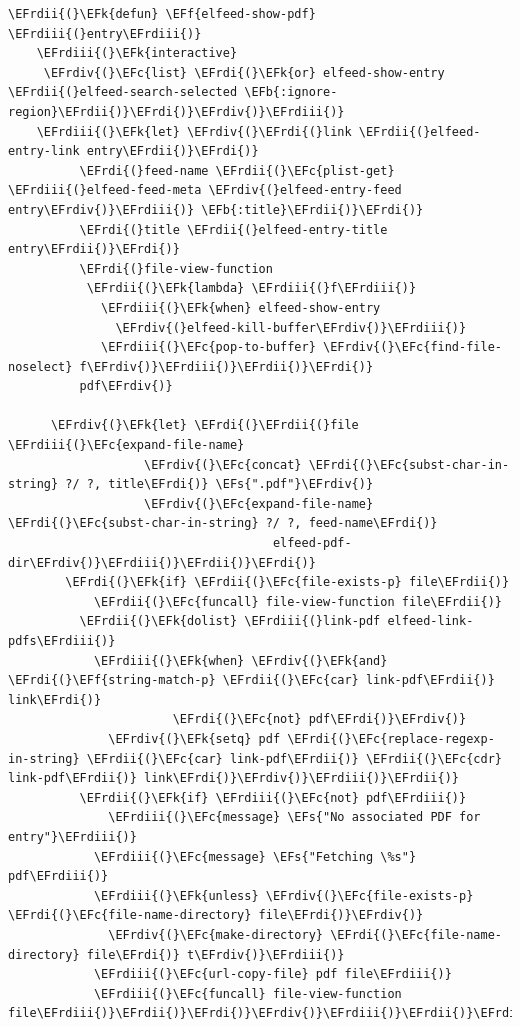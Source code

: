 \documentclass{scrartcl}
\newcommand{\EFk}[1]{\textcolor{EFk}{#1}} %
\newcommand{\EFs}[1]{\textcolor{EFs}{#1}} %
\newcommand{\EFb}[1]{\textcolor{EFb}{#1}} %
\newcommand{\EFc}[1]{\textcolor{EFc}{#1}} %
\newcommand{\EFf}[1]{\textcolor{EFf}{#1}} %
\newcommand{\EFrdi}[1]{\textcolor{EFrdi}{#1}} %
\newcommand{\EFrdii}[1]{\textcolor{EFrdii}{#1}} %
\newcommand{\EFrdiii}[1]{\textcolor{EFrdiii}{#1}} %
\newcommand{\EFrdiv}[1]{\textcolor{EFrdiv}{#1}} %
\begin{document}
\begin{Code}
\begin{Verbatim}[]
  \EFrdii{(}\EFk{defun} \EFf{elfeed-show-pdf} \EFrdiii{(}entry\EFrdiii{)}
    \EFrdiii{(}\EFk{interactive}
     \EFrdiv{(}\EFc{list} \EFrdi{(}\EFk{or} elfeed-show-entry \EFrdii{(}elfeed-search-selected \EFb{:ignore-region}\EFrdii{)}\EFrdi{)}\EFrdiv{)}\EFrdiii{)}
    \EFrdiii{(}\EFk{let} \EFrdiv{(}\EFrdi{(}link \EFrdii{(}elfeed-entry-link entry\EFrdii{)}\EFrdi{)}
          \EFrdi{(}feed-name \EFrdii{(}\EFc{plist-get} \EFrdiii{(}elfeed-feed-meta \EFrdiv{(}elfeed-entry-feed entry\EFrdiv{)}\EFrdiii{)} \EFb{:title}\EFrdii{)}\EFrdi{)}
          \EFrdi{(}title \EFrdii{(}elfeed-entry-title entry\EFrdii{)}\EFrdi{)}
          \EFrdi{(}file-view-function
           \EFrdii{(}\EFk{lambda} \EFrdiii{(}f\EFrdiii{)}
             \EFrdiii{(}\EFk{when} elfeed-show-entry
               \EFrdiv{(}elfeed-kill-buffer\EFrdiv{)}\EFrdiii{)}
             \EFrdiii{(}\EFc{pop-to-buffer} \EFrdiv{(}\EFc{find-file-noselect} f\EFrdiv{)}\EFrdiii{)}\EFrdii{)}\EFrdi{)}
          pdf\EFrdiv{)}

      \EFrdiv{(}\EFk{let} \EFrdi{(}\EFrdii{(}file \EFrdiii{(}\EFc{expand-file-name}
                   \EFrdiv{(}\EFc{concat} \EFrdi{(}\EFc{subst-char-in-string} ?/ ?, title\EFrdi{)} \EFs{".pdf"}\EFrdiv{)}
                   \EFrdiv{(}\EFc{expand-file-name} \EFrdi{(}\EFc{subst-char-in-string} ?/ ?, feed-name\EFrdi{)}
                                     elfeed-pdf-dir\EFrdiv{)}\EFrdiii{)}\EFrdii{)}\EFrdi{)}
        \EFrdi{(}\EFk{if} \EFrdii{(}\EFc{file-exists-p} file\EFrdii{)}
            \EFrdii{(}\EFc{funcall} file-view-function file\EFrdii{)}
          \EFrdii{(}\EFk{dolist} \EFrdiii{(}link-pdf elfeed-link-pdfs\EFrdiii{)}
            \EFrdiii{(}\EFk{when} \EFrdiv{(}\EFk{and} \EFrdi{(}\EFf{string-match-p} \EFrdii{(}\EFc{car} link-pdf\EFrdii{)} link\EFrdi{)}
                       \EFrdi{(}\EFc{not} pdf\EFrdi{)}\EFrdiv{)}
              \EFrdiv{(}\EFk{setq} pdf \EFrdi{(}\EFc{replace-regexp-in-string} \EFrdii{(}\EFc{car} link-pdf\EFrdii{)} \EFrdii{(}\EFc{cdr} link-pdf\EFrdii{)} link\EFrdi{)}\EFrdiv{)}\EFrdiii{)}\EFrdii{)}
          \EFrdii{(}\EFk{if} \EFrdiii{(}\EFc{not} pdf\EFrdiii{)}
              \EFrdiii{(}\EFc{message} \EFs{"No associated PDF for entry"}\EFrdiii{)}
            \EFrdiii{(}\EFc{message} \EFs{"Fetching \%s"} pdf\EFrdiii{)}
            \EFrdiii{(}\EFk{unless} \EFrdiv{(}\EFc{file-exists-p} \EFrdi{(}\EFc{file-name-directory} file\EFrdi{)}\EFrdiv{)}
              \EFrdiv{(}\EFc{make-directory} \EFrdi{(}\EFc{file-name-directory} file\EFrdi{)} t\EFrdiv{)}\EFrdiii{)}
            \EFrdiii{(}\EFc{url-copy-file} pdf file\EFrdiii{)}
            \EFrdiii{(}\EFc{funcall} file-view-function file\EFrdiii{)}\EFrdii{)}\EFrdi{)}\EFrdiv{)}\EFrdiii{)}\EFrdii{)}\EFrdi{)}
\end{Verbatim}
\end{Code}
\end{document}
